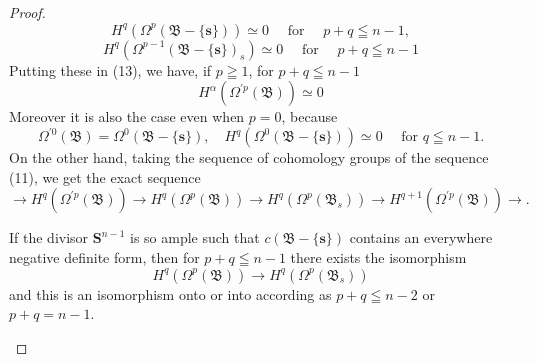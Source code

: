 \documentclass[lang=en,12pt]{beautybook}
\begin{document}
\begin{proof}
  \begin{equation*}
    H^q\left(\Omega^p(\mathfrak{B}-\{\boldsymbol{s}\})\right) \simeq 0 \quad \text { for } \quad p+q \leqq n-1,
  \end{equation*}
  \begin{equation*}
    H^q\left(\Omega^{p-1}(\mathfrak{B}-\{\boldsymbol{s}\})_s\right) \simeq 0 \quad \text { for } \quad p+q \leqq n-1
  \end{equation*}
  Putting these in (13), we have, if $p \geqq 1$, for $p+q \leqq n-1$
  \begin{equation*}
    H^\alpha\left(\Omega^{\prime p}(\mathfrak{B})\right) \simeq 0
  \end{equation*}
  Moreover it is also the case even when $p=0$, because
  $$\Omega^{\prime 0}(\mathfrak{B})=\Omega^0(\mathfrak{B}-\{\boldsymbol{s}\}), \quad H^q\left(\Omega^0(\mathfrak{B}-\{\boldsymbol{s}\})\right) \simeq 0 \quad\text{ for }q \leqq n-1.$$
  On the other hand, taking the sequence of cohomology groups of the sequence (11), we get the exact sequence
  \begin{equation*}
    \rightarrow H^q\left(\Omega^{\prime p}(\mathfrak{B})\right) \rightarrow H^q\left(\Omega^p(\mathfrak{B})\right) \rightarrow H^q\left(\Omega^p\left(\mathfrak{B}_s\right)\right) \rightarrow H^{q+1}\left(\Omega^{\prime p}(\mathfrak{B})\right) \rightarrow .
  \end{equation*}

  \begin{theorem}
    If the divisor $\boldsymbol{S}^{n-1}$ is so ample such that $c(\mathfrak{B}-\{\boldsymbol{s}\})$ contains an everywhere negative definite form, then for $p+q \leqq n-1$ there exists the isomorphism
    \begin{equation*}
      H^q\left(\Omega^p(\mathfrak{B})\right) \rightarrow H^q\left(\Omega^p\left(\mathfrak{B}_s\right)\right)
    \end{equation*}
    and this is an isomorphism onto or into according as $p+q \leqq n-2$ or $p+q=n-1$.
  \end{theorem}


\end{proof}
\end{document}
